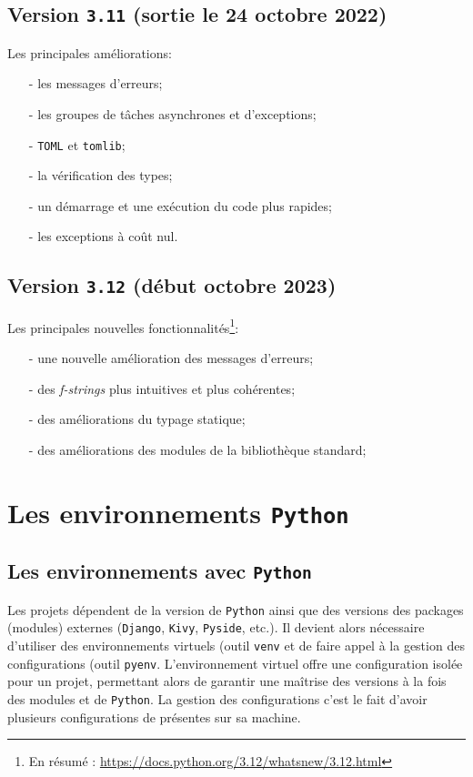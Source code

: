 \documentclass[a4paper,12pt]{book}
\begin{document}
\section{Version \texttt{3.11} (sortie le 24 octobre 2022)}
Les principales améliorations:
\begin{itemize}
	\item[-] les messages d'erreurs;
	\item[-] les groupes de tâches asynchrones et d'exceptions;
	\item[-] \texttt{TOML} et \texttt{tomlib};
	\item[-] la vérification des types;
	\item[-] un démarrage et une exécution du code plus rapides;
	\item[-] les exceptions à coût nul.
\end{itemize}
\medskip

\section{Version \texttt{3.12} (début octobre 2023)}
Les principales nouvelles fonctionnalités\footnote{En résumé : \url{https://docs.python.org/3.12/whatsnew/3.12.html}}:
\begin{itemize}
	\item[-] une nouvelle amélioration des messages d'erreurs;
	\item[-] des \textit{f-strings} plus intuitives et plus cohérentes;
	\item[-] des améliorations du typage statique;
	\item[-] des améliorations des modules de la bibliothèque standard;
\end{itemize}
\chapter{Les environnements \texttt{Python}}
\section{Les environnements avec \texttt{Python}}
Les projets dépendent de la version de \texttt{Python} ainsi que des versions des packages (modules) externes (\texttt{Django}, \texttt{Kivy}, \texttt{Pyside}, etc.). Il devient alors nécessaire d'utiliser des environnements virtuels (outil \texttt{venv} et de faire appel à la gestion des configurations (outil \texttt{pyenv}. L'environnement virtuel offre une configuration isolée pour un projet, permettant alors de garantir une maîtrise des versions à la fois des modules et de \texttt{Python}. La gestion des configurations c'est le fait d'avoir plusieurs configurations de présentes sur sa machine.
\medskip
\end{document}
